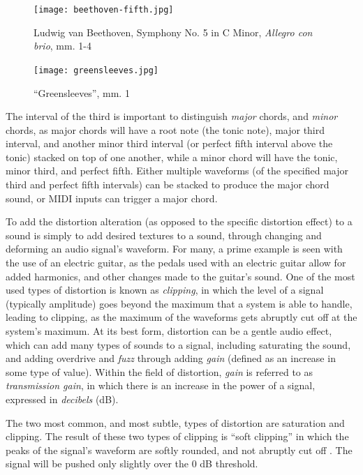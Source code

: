 \begin{figure}
  \centering
  \texttt{[image: beethoven-fifth.jpg]}
  \caption{Ludwig van Beethoven, Symphony No. 5 in C Minor, \textit{Allegro con brio}, mm. 1-4}
  \label{fig:beethoven-fifth}
\end{figure}

\begin{figure}
  \centering
  \texttt{[image: greensleeves.jpg]}
  \caption{``Greensleeves'', mm. 1}
  \label{fig:greensleeves}
\end{figure}

The interval of the third is important to distinguish \textit{major} chords, and \textit{minor} chords, as major chords will have a root note (the tonic note), major third interval, and another minor third interval (or perfect fifth interval above the tonic) stacked on top of one another, while a minor chord will have the tonic, minor third, and perfect fifth. Either multiple waveforms (of the specified major third and perfect fifth intervals) can be stacked to produce the major chord sound, or MIDI inputs can trigger a major chord.

To add the distortion alteration (as opposed to the specific distortion effect) to a sound is simply to add desired textures to a sound, through changing and deforming an audio signal's waveform. For many, a prime example is seen with the use of an electric guitar, as the pedals used with an electric guitar allow for added harmonics, and other changes made to the guitar's sound. One of the most used types of distortion is known as \textit{clipping}, in which the level of a signal (typically amplitude) goes beyond the maximum that a system is able to handle, leading to clipping, as the maximum of the waveforms gets abruptly cut off at the system's maximum. At its best form, distortion can be a gentle audio effect, which can add many types of sounds to a signal, including saturating the sound, and adding overdrive and \textit{fuzz} through adding \textit{gain} (defined as an increase in some type of value). Within the field of distortion, \textit{gain} is referred to as \textit{transmission gain}, in which there is an increase in the power of a signal, expressed in \textit{decibels} (dB).

The two most common, and most subtle, types of distortion are saturation and clipping. The result of these two types of clipping is ``soft clipping'' in which the peaks of the signal's waveform are softly rounded, and not abruptly cut off \cite{Tarr_2019}. The signal will be pushed only slightly over the 0 dB threshold. 

